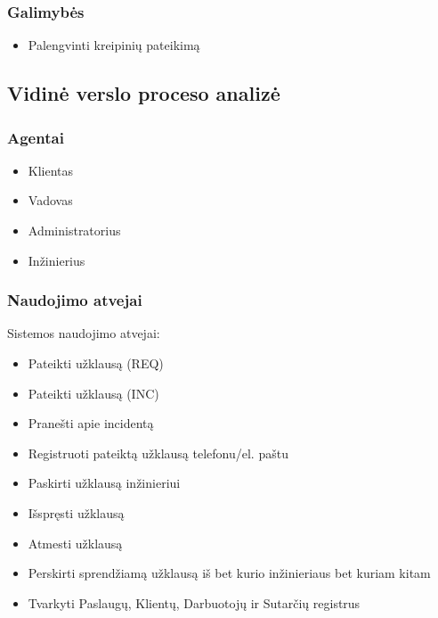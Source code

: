 \subsubsection{Galimybės}
\begin{itemize}
\item Palengvinti kreipinių pateikimą 
\end{itemize}

\subsection{Vidinė verslo proceso analizė}
\subsubsection{Agentai}
\begin{itemize}
\item Klientas
\item Vadovas
\item Administratorius
\item Inžinierius
\end{itemize}
\subsubsection{Naudojimo atvejai}
Sistemos naudojimo atvejai:
\begin{itemize}
\item Pateikti užklausą (REQ)
\item Pateikti užklausą (INC)
\item Pranešti apie incidentą
\item Registruoti pateiktą užklausą telefonu/el. paštu
\item Paskirti užklausą inžinieriui
\item Išspręsti užklausą
\item Atmesti užklausą
\item Perskirti sprendžiamą užklausą iš bet kurio inžinieriaus bet kuriam kitam
\item Tvarkyti Paslaugų, Klientų, Darbuotojų ir Sutarčių registrus
\end{itemize}



